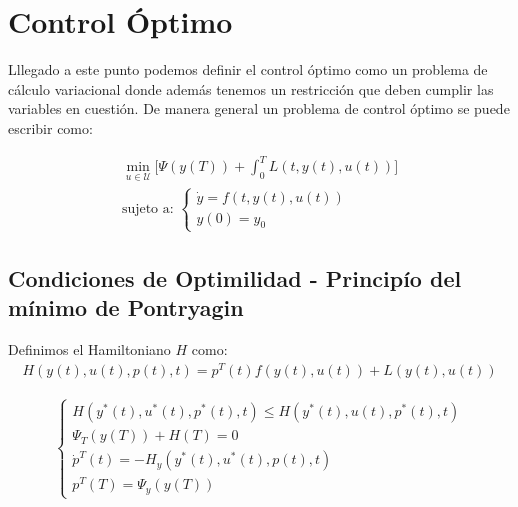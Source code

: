 \section{Control Óptimo}

Lllegado a este punto podemos definir el control óptimo como un problema de cálculo variacional donde además tenemos un restricción que deben cumplir las variables en cuestión. De manera general un problema de control óptimo se puede escribir como:

\begin{gather}
    \min_{u \in \mathcal{U} } \Big[ \Psi(y(T)) + \int_0^T L (t,y(t),u(t)) \Big] \\
    \text{sujeto a: } \begin{cases}
        \dot{y} = f(t,y(t),u(t)) \\
        y(0) = y_0
    \end{cases} 
\end{gather}

\subsection{Condiciones de Optimilidad - Principío del mínimo de Pontryagin}

Definimos el Hamiltoniano $H$ como:
\begin{gather}
    H(y(t),u(t),p(t),t) = p^T(t)f(y(t),u(t)) + L(y(t),u(t))
\end{gather}

\begin{gather}
    \begin{cases}
        H(y^*(t),u^*(t),p^*(t),t) \leq  H(y^*(t),u(t),p^*(t),t) \\
        \Psi_T(y(T)) + H(T) = 0 \\
        \dot{p}^T(t) = -H_y(y^*(t),u^*(t),p(t),t) \\
        p^T(T) = \Psi_y(y(T)) 
   \end{cases}
\end{gather}
